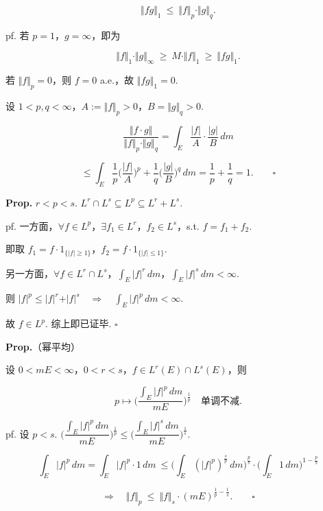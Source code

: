 \documentclass[11pt]{ctexart}
\theoremstyle{definition}
\begin{document}
\[
\Vert fg\Vert_1 \ \leq\ \Vert f\Vert_p \cdot \Vert g\Vert_q.
\]

pf. 若 $p = 1$，$g = \infty$，即为

\[
\Vert f\Vert_1 \cdot \Vert g\Vert_\infty \ \geq\ M \cdot \Vert f\Vert_1 \ \geq\ \Vert fg\Vert_1.
\]

若 $\Vert f\Vert_p = 0$，则 $f = 0$  a.e.，故 $\Vert fg\Vert_1 = 0$.

设 $1 < p, q < \infty$，$A := \Vert f\Vert_p > 0$，$B = \Vert g\Vert_q > 0$.

\[
\frac{\Vert f \cdot g\Vert}{\Vert f\Vert_p \cdot \Vert g\Vert_q} = \int_E \frac{\vert f\vert}{A} \cdot \frac{\vert g\vert}{B} \, dm
\]

\[
\leq \int_E \frac{1}{p} \Big( \frac{\vert f\vert}{A} \Big)^p + \frac{1}{q} \Big( \frac{\vert g\vert}{B} \Big)^q \, dm = \frac{1}{p} + \frac{1}{q} = 1. \qquad \square
\]

\textbf{Prop.} $r < p < s$. $L^r \cap L^s \subseteq L^p \subseteq L^r + L^s$.

pf. 一方面，$\forall f \in L^p$，$\exists f_1 \in L^r$，$f_2 \in L^s$，s.t. $f = f_1 + f_2$.

即取 $f_1 = f \cdot 1_{\{\vert f\vert \geq 1\}}$，$f_2 = f \cdot 1_{\{\vert f\vert \leq 1\}}$.

另一方面，$\forall f \in L^r \cap L^s$，$\displaystyle\int_E \vert f\vert^r \, dm$，$\displaystyle\int_E \vert f\vert^s \, dm < \infty$.

则 $\vert f\vert^p \leq \vert f\vert^r + \vert f\vert^s \quad \Rightarrow \quad \int_E \vert f\vert^p \, dm < \infty$.

故 $f \in L^p$. 综上即已证毕. $\square$

\textbf{Prop.}（幂平均）

设 $0 < mE < \infty$，$0 < r < s$，$f \in L^r(E) \cap L^s(E)$，则

\[
p \mapsto \Big( \frac{\int_E \vert f\vert^p \, dm}{mE} \Big)^{\frac{1}{p}} \quad \text{单调不减}.
\]

pf. 设 $p < s$. $\Big( \dfrac{\int_E \vert f\vert^p \, dm}{mE} \Big)^{\frac{1}{p}} \leq \Big( \dfrac{\int_E \vert f\vert^s \, dm}{mE} \Big)^{\frac{1}{s}}$.

\[
\int_E \vert f\vert^p \, dm = \int_E \vert f\vert^p \cdot 1 \, dm \ \leq \Big( \int_E (\vert f\vert^p)^{\frac{s}{p}} \, dm \Big)^{\frac{p}{s}} \cdot \Big( \int_E 1 \, dm \Big)^{1 - \frac{p}{s}}
\]

\[
\Rightarrow \quad \Vert f\Vert_p \ \leq\ \Vert f\Vert_s \cdot (mE)^{\frac{1}{p} - \frac{1}{s}}. \qquad \square
\]
\end{document}
